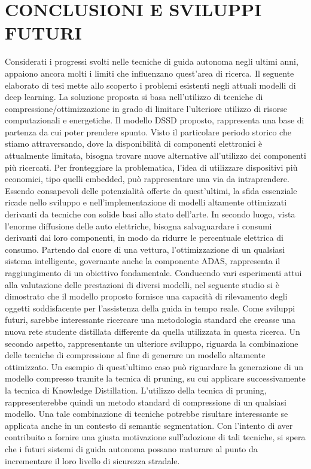 
\chapter{CONCLUSIONI E SVILUPPI FUTURI}
\label{Capitolo5}
\thispagestyle{empty}

Considerati i progressi svolti nelle tecniche di guida autonoma negli ultimi anni, appaiono ancora molti i limiti che influenzano quest'area di ricerca. Il seguente elaborato di tesi mette allo scoperto i problemi esistenti negli attuali modelli di deep learning. La soluzione proposta si basa nell'utilizzo di tecniche di compressione/ottimizzazione in grado di limitare l'ulteriore utilizzo di risorse computazionali e energetiche. Il modello DSSD proposto, rappresenta una base di partenza da cui poter prendere spunto. Visto il particolare periodo storico che stiamo attraversando, dove la disponibilità di componenti elettronici è attualmente limitata, bisogna trovare nuove alternative all'utilizzo dei componenti più ricercati. Per fronteggiare la problematica, l'idea di utilizzare dispositivi più economici, tipo quelli embedded, può rappresentare una via da intraprendere.
Essendo consapevoli delle potenzialità offerte da quest'ultimi, la sfida essenziale ricade nello sviluppo e nell'implementazione di modelli altamente ottimizzati derivanti da tecniche con solide basi allo stato dell'arte. In secondo luogo, vista l'enorme diffusione delle auto elettriche, bisogna salvaguardare i consumi derivanti dai loro componenti, in modo da ridurre le percentuale elettrica di consumo. Partendo dal cuore di una vettura, l'ottimizzazione di un qualsiasi sistema intelligente, governante anche la componente ADAS,  rappresenta il raggiungimento di un obiettivo fondamentale. Conducendo vari esperimenti attui alla valutazione delle prestazioni di diversi modelli, nel seguente studio si è dimostrato che il modello proposto fornisce una capacità di rilevamento degli oggetti soddisfacente per l'assistenza della guida in tempo reale.
Come sviluppi futuri, sarebbe interessante ricercare una metodologia standard che creasse una nuova rete studente distillata differente da quella utilizzata in questa ricerca. Un secondo aspetto, rappresentante un ulteriore sviluppo, riguarda la combinazione delle tecniche di compressione al fine di generare un modello altamente ottimizzato. Un esempio di quest'ultimo caso può riguardare la generazione di un modello compresso tramite la tecnica di pruning, su cui applicare successivamente la tecnica di Knowledge Distillation. L'utilizzo della tecnica di pruning, rappresenterebbe quindi un metodo standard di compressione di un qualsiasi modello. Una tale combinazione di tecniche potrebbe risultare interessante se applicata anche in un contesto di semantic segmentation. Con l'intento di aver contribuito a fornire una giusta motivazione sull'adozione di tali tecniche, si spera che i futuri sistemi di guida autonoma possano maturare al punto da incrementare il loro livello di sicurezza stradale.